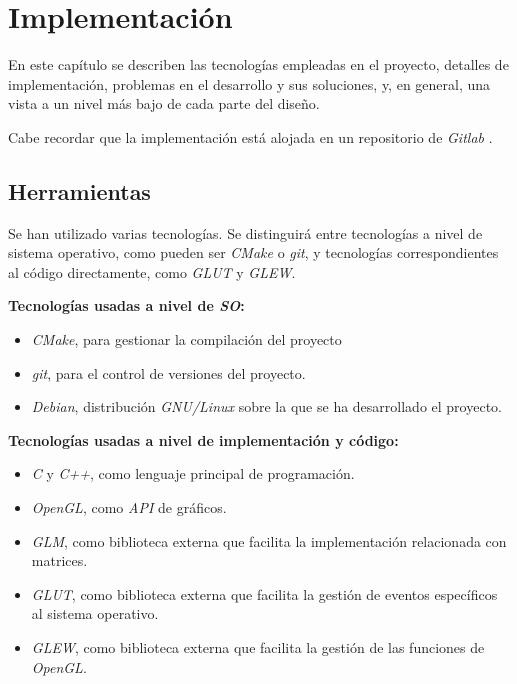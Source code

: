 \chapter{Implementación} \label{chp:implementation}

En este capítulo se describen las tecnologías empleadas en el proyecto, detalles de implementación, problemas en el desarrollo y sus soluciones, y, en general, una vista a un nivel más bajo de cada parte del diseño.

Cabe recordar que la implementación está alojada en un repositorio de \textit{Gitlab} \cite{webGitlabRenderer}.

\section{Herramientas}
Se han utilizado varias tecnologías. Se distinguirá entre tecnologías a nivel de sistema operativo, como pueden ser \textit{CMake} o \textit{git}, y tecnologías correspondientes al código directamente, como \textit{GLUT} y \textit{GLEW}.

\textbf{Tecnologías usadas a nivel de \textit{SO}:}

\begin{itemize}
    \item \textit{CMake}, para gestionar la compilación del proyecto
    \item \textit{git}, para el control de versiones del proyecto.
    \item \textit{Debian}, distribución \textit{GNU/Linux} sobre la que se ha desarrollado el proyecto.
\end{itemize}

\textbf{Tecnologías usadas a nivel de implementación y código:}

\begin{itemize}
    \item \textit{C} y \textit{C++}, como lenguaje principal de programación.
    \item \textit{OpenGL}, como \textit{API} de gráficos.
    \item \textit{GLM}, como biblioteca externa que facilita la implementación relacionada con matrices.
    \item \textit{GLUT}, como biblioteca externa que facilita la gestión de eventos específicos al sistema operativo.
    \item \textit{GLEW}, como biblioteca externa que facilita la gestión de las funciones de \textit{OpenGL}.
\end{itemize}


